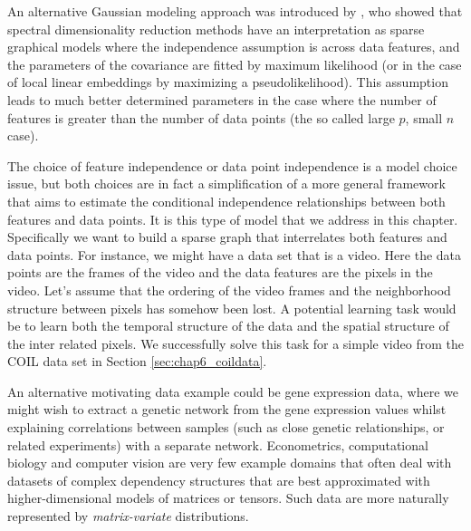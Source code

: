   An alternative Gaussian modeling approach was introduced by \citet{Lawrence:unifying12}, who showed that spectral dimensionality reduction methods have an interpretation as sparse graphical models where the independence assumption is across data features, and the parameters of the covariance are fitted by maximum likelihood (or in the case of local linear embeddings \citep{Roweis:lle00} by maximizing a pseudolikelihood).
  This assumption leads to much better determined parameters in the case where the number of features is greater than the number of data points (the so called large $p$, small $n$ case). 

  The choice of feature independence or data point independence is a model choice issue, but both choices are in fact a simplification of a more general framework that aims to estimate the conditional independence relationships between both features and data points.
  It is this type of model that we address in this chapter.
  Specifically we want to build a sparse graph that interrelates both features and data points. 
    For instance, we might have a data set that is a video.
    Here the data points are the frames of the video and the data features are the pixels in the video.
    Let's assume that the ordering of the video frames and the neighborhood structure between pixels has somehow been lost.
    A potential learning task would be to learn both the temporal structure of the data and the spatial structure of the inter related pixels.
    We successfully solve this task for a simple video from the COIL data set in Section \ref{sec:chap6_coildata}.
    
    An alternative motivating data example could be gene expression data, where we might wish to extract a genetic network from the gene expression values whilst explaining correlations between samples (such as close genetic relationships, or related experiments) with a separate network.
    Econometrics, computational biology and computer vision are very few example domains that often deal with datasets of complex dependency structures that are best approximated with higher-dimensional models of matrices or tensors.
    Such data are more naturally represented by \emph{matrix-variate} distributions.
  

